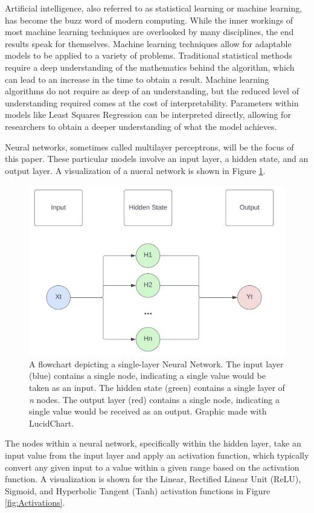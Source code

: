 Artificial intelligence, also referred to as statistical learning or machine learning, has become the buzz word of modern computing. While the inner workings of most machine learning techniques are overlooked by many disciplines, the end results speak for themselves. Machine learning techniques allow for adaptable models to be applied to a variety of problems. Traditional statistical methods require a deep understanding of the mathematics behind the algorithm, which can lead to an increase in the time to obtain a result. Machine learning algorithms do not require as deep of an understanding, but the reduced level of understanding required comes at the cost of  interpretability. Parameters within models like Least Squares Regression can be interpreted directly, allowing for researchers to obtain a deeper understanding of what the model achieves. 

Neural networks, sometimes called multilayer perceptrons, will be the focus of this paper. These particular models involve an input layer, a hidden state, and an output layer. A visualization of a nueral network is shown in Figure \ref{fig:NueralNetwork}.

\begin{figure}[ht]
    \centering
    \includegraphics[width=0.6\linewidth]{"Figures/Traditional_NN.png"}
    \caption{A flowchart depicting a single-layer Neural Network. The input layer (blue) contains a single node, indicating a single value would be taken as an input. The hidden state (green) contains a single layer of \textit{n} nodes. The output layer (red) contains a single node, indicating a single value would be received as an output. Graphic made with LucidChart.}
    \label{fig:NueralNetwork}
\end{figure}

The nodes within a neural network, specifically within the hidden layer, take an input value from the input layer and apply an activation function, which typically convert any given input to a value within a given range based on the activation function. A visualization is shown for the Linear, Rectified Linear Unit (ReLU), Sigmoid, and Hyperbolic Tangent (Tanh) activation functions in Figure \ref{fig:Activations}.

